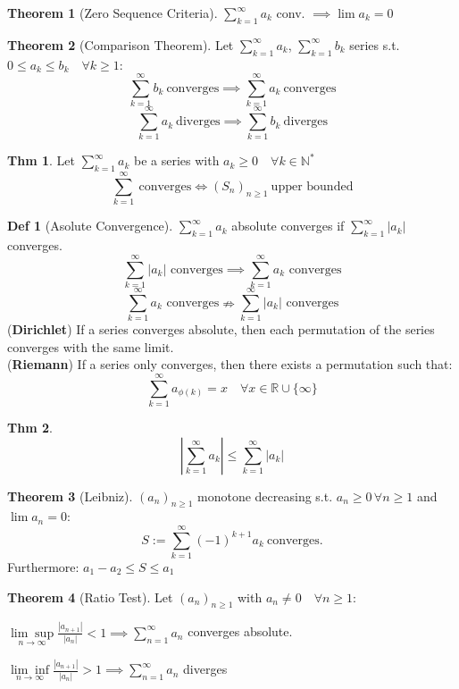 \documentclass[a4paper, 10pt]{article}
\theoremstyle{definition}
\newtheorem*{theorem}{Thm}
\newtheorem*{definition}{Def}
\theoremstyle{named}
\newtheorem*{ntheorem_wrapper}{Theorem}
\newenvironment{ntheorem}%
    {\begin{mdframed}[style=important]\begin{ntheorem_wrapper}}%
    {\end{ntheorem_wrapper}\end{mdframed}}
\newcommand{\R}{\mathbb{R}}
\newcommand{\N}{\mathbb{N}}
\begin{document}
\begin{ntheorem}[Zero Sequence Criteria]
    $\sum\limits_{k=1}^\infty a_k$ conv. $\implies \lim a_k = 0$
\end{ntheorem}

\begin{ntheorem}[Comparison Theorem]
    Let $\sum_{k = 1}^\infty a_k$, $\sum_{k = 1}^\infty b_k$ series s.t. $0 \leq a_k \leq b_k \quad \forall k \geq 1$:
    $$\sum_{k=1}^\infty b_k \ \text{converges} \implies \sum_{k = 1}^\infty a_k \ \text{converges}$$
    $$\sum_{k = 1}^\infty  a_k \ \text{diverges} \implies \sum_{k = 1}^\infty  b_k \ \text{diverges}$$
\end{ntheorem}

\begin{theorem}
    Let $\sum_{k=1}^\infty a_k$ be a series with $a_k \geq 0 \quad \forall k \in \N^*$
    $$\sum_{k=1}^\infty \ \text{converges} \iff (S_n)_{n\geq1} \ \text{upper bounded}$$
\end{theorem}

\begin{definition}[Asolute Convergence]
    $\sum_{k=1}^\infty a_k$ absolute converges if $\sum_{k=1}^\infty |a_k|$ converges.
    $$\sum_{k = 1}^\infty |a_k| \text{ converges} \implies \sum_{k=1}^\infty a_k \text{ converges}$$
    $$\sum_{k=1}^\infty a_k \text{ converges} \nRightarrow \sum_{k=1}^\infty |a_k| \text{ converges}$$
    (\textbf{Dirichlet}) If a series converges absolute, then each permutation of the series converges with the same limit. \\
    (\textbf{Riemann}) If a series only converges, then there exists a permutation such that: $$\sum_{k=1}^\infty a_{\phi(k)} = x \quad \forall x \in \R \cup \{\infty\}$$
\end{definition}

\begin{theorem}
    $$\left|\sum_{k=1}^\infty a_k\right| \leq \sum_{k=1}^\infty |a_k|$$
\end{theorem}

\begin{ntheorem}[Leibniz]
    $(a_n)_{n\geq1}$ monotone decreasing s.t. $a_n \geq 0 \, \forall n \geq 1$ and $\lim a_n = 0$:
    $$S := \sum_{k=1}^\infty (-1)^{k + 1} a_k \ \text{converges.}$$
    Furthermore: $a_1 - a_2 \leq S \leq a_1$
    
\end{ntheorem}

\begin{ntheorem}[Ratio Test]
    Let $(a_n)_{n \geq 1}$ with $a_n \neq 0 \quad \forall n\geq 1$:
    
    $\underset{n\to\infty}{\lim\sup} \frac{|a_{n+1}|}{|a_n|} < 1 \implies \sum_{n=1}^\infty a_n$ converges absolute.

    $\underset{n\to\infty}{\lim\inf} \frac{|a_{n+1}|}{|a_n|} > 1 \implies \sum_{n=1}^\infty a_n$ diverges
\end{ntheorem}
\end{document}
